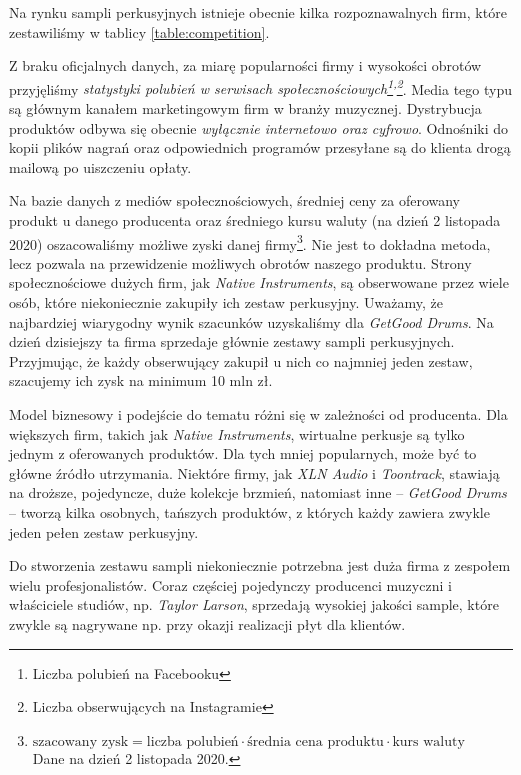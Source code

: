 \documentclass[12pt]{article}
\begin{document}
Na rynku sampli perkusyjnych istnieje obecnie kilka rozpoznawalnych firm, które zestawiliśmy w tablicy \ref{table:competition}.

Z braku oficjalnych danych, za miarę popularności firmy i wysokości obrotów przyjęliśmy \emph{statystyki polubień w serwisach społecznościowych\footnote{Liczba polubień na Facebooku\label{footnote:facebook}}\textsuperscript{,}\footnote{Liczba obserwujących na Instagramie\label{footnote:instagram}}}.
Media tego typu są głównym kanałem marketingowym firm w branży muzycznej.
Dystrybucja produktów odbywa się obecnie \emph{wyłącznie internetowo oraz cyfrowo}.
Odnośniki do kopii plików nagrań oraz odpowiednich programów przesyłane są do klienta drogą mailową po uiszczeniu opłaty.

Na bazie danych z mediów społecznościowych, średniej ceny za oferowany produkt u danego producenta oraz średniego kursu waluty (na dzień 2 listopada 2020) oszacowaliśmy możliwe zyski danej firmy\footnote{$\text{szacowany zysk} = \text{liczba polubień} \cdot \text{średnia cena produktu} \cdot \text{kurs waluty}$ \\ Dane na dzień 2 listopada 2020.\label{footnote:income}}.
Nie jest to dokładna metoda, lecz pozwala na przewidzenie możliwych obrotów naszego produktu.
Strony społecznościowe dużych firm, jak \textit{Native Instruments}, są obserwowane przez wiele osób, które niekoniecznie zakupiły ich zestaw perkusyjny.
Uważamy, że najbardziej wiarygodny wynik szacunków uzyskaliśmy dla \textit{GetGood Drums}.
Na dzień dzisiejszy ta firma sprzedaje głównie zestawy sampli perkusyjnych.
Przyjmując, że każdy obserwujący zakupił u nich co najmniej jeden zestaw, szacujemy ich zysk na minimum 10 mln zł.

Model biznesowy i podejście do tematu różni się w zależności od producenta.
Dla większych firm, takich jak \textit{Native Instruments}, wirtualne perkusje są tylko jednym z oferowanych produktów.
Dla tych mniej popularnych, może być to główne źródło utrzymania.
Niektóre firmy, jak \textit{XLN Audio} i \textit{Toontrack}, stawiają na droższe, pojedyncze, duże kolekcje brzmień, natomiast inne -- \textit{GetGood Drums} -- tworzą kilka osobnych, tańszych produktów, z których każdy zawiera zwykle jeden pełen zestaw perkusyjny.

Do stworzenia zestawu sampli niekoniecznie potrzebna jest duża firma z zespołem wielu profesjonalistów.
Coraz częściej pojedynczy producenci muzyczni i właściciele studiów, np. \textit{Taylor Larson}, sprzedają wysokiej jakości sample, które zwykle są nagrywane np. przy okazji realizacji płyt dla klientów.
\end{document}
